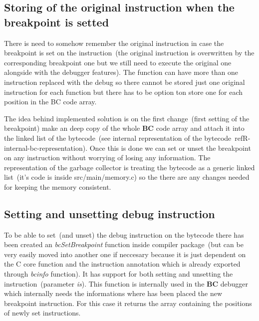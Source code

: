 \documentclass[thesis=M,english]{FITthesis}[2018/10/20]
\begin{document}
\subsection{Storing of the original instruction when the breakpoint is setted}\label{storing-original-instructions}

There is need to somehow remember the original instruction in case the breakpoint is set on the instruction~(the original instruction is overwritten by the corresponding breakpoint one but we still need to execute the original one alongside with the debugger features). The function can have more than one instruction replaced with the debug so there cannot be stored just one original instruction for each function but there has to be option ton store one for each position in the BC code array.

The idea behind implemented solution is on the first change~(first setting of the breakpoint) make an deep copy of the whole \textbf{BC} code array and attach it into the linked list of the bytecode~(see internal representation of the bytecode~ref{R-internal-bc-representation}). Once this is done we can set or unset the breakpoint on any instruction without worrying of losing any information. The representation of the garbage collector is treating the bytecode as a generic linked list~(it's code is inside src/main/memory.c) so the there are any changes needed for keeping the memory consistent.

\subsection{Setting and unsetting debug instruction}\label{setting-and-unsetting-debug-instruction}

To be able to set~(and unset) the debug instruction on the bytecode there has been created an \textit{bcSetBreakpoint} function inside compiler package~(but can be very easily moved into another one if neccesary because it is just dependent on the C core function and the instruction annotation which is already exported through \textit{bcinfo} function). It has support for both setting and unsetting the instruction~(parameter \textit{is}). This function is internally used in the \textbf{BC} debugger which internally needs the informations where has been placed the new breakpoint instruction. For this case it returns the array containing the positions of newly set instructions. 
\end{document}
